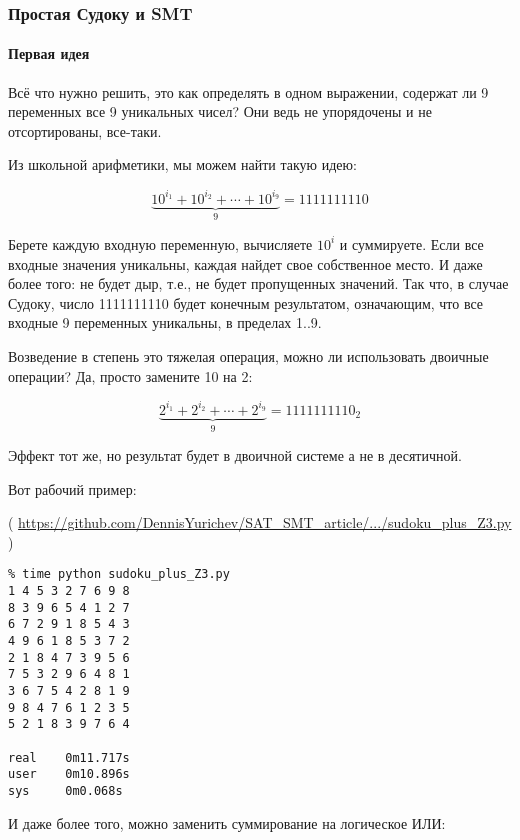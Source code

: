\subsubsection{Простая Судоку и SMT}
\label{sudoku_SMT}

\paragraph{Первая идея}

Всё что нужно решить, это как определять в одном выражении, содержат ли 9 переменных все 9 уникальных чисел?
Они ведь не упорядочены и не отсортированы, все-таки.

Из школьной арифметики, мы можем найти такую идею:

\begin{equation}
\underbrace{10^{i_1} + 10^{i_2} + \cdots + 10^{i_9}}_9 = 1111111110
\end{equation}

Берете каждую входную переменную, вычисляете $10^i$ и суммируете.
Если все входные значения уникальны, каждая найдет свое собственное место.
И даже более того: не будет дыр, т.е., не будет пропущенных значений.
Так что, в случае Судоку, число 1111111110 будет конечным результатом, означающим, что все входные
9 переменных уникальны, в пределах 1..9.

Возведение в степень это тяжелая операция, можно ли использовать двоичные операции? Да, просто замените 10 на 2:

\begin{equation}
\underbrace{2^{i_1} + 2^{i_2} + \cdots + 2^{i_9}}_9 = 1111111110_2
\end{equation}

Эффект тот же, но результат будет в двоичной системе а не в десятичной.

Вот рабочий пример:


( \url{https://github.com/DennisYurichev/SAT_SMT_article/.../sudoku_plus_Z3.py} )

\begin{lstlisting}
% time python sudoku_plus_Z3.py
1 4 5 3 2 7 6 9 8
8 3 9 6 5 4 1 2 7
6 7 2 9 1 8 5 4 3
4 9 6 1 8 5 3 7 2
2 1 8 4 7 3 9 5 6
7 5 3 2 9 6 4 8 1
3 6 7 5 4 2 8 1 9
9 8 4 7 6 1 2 3 5
5 2 1 8 3 9 7 6 4

real    0m11.717s
user    0m10.896s
sys     0m0.068s
\end{lstlisting}

И даже более того, можно заменить суммирование на логическое ИЛИ:

